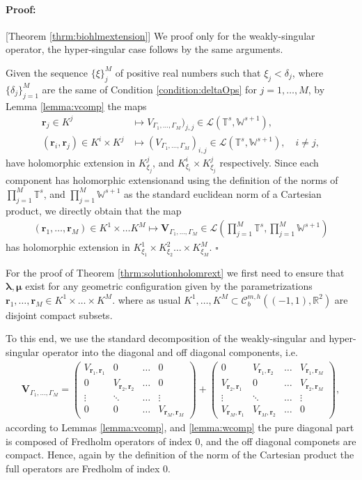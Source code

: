 \documentclass{article}
\newenvironment{proof}{\paragraph{Proof:}}{\hfill$\square$}
\newcommand{\bmu} {\bm{\mu}}
\newcommand{\IR}{{\mathbb R}}
\newcommand{\IT}{{\mathbb T}}
\newcommand{\IW}{{\mathbb W}}
\newcommand{\rgeoh}[2]{\mathcal{C}_b^{#1,#2}\left( (-1,1), \IR^2 \right)}
\newcommand{\bla}{\boldsymbol \lambda}
\newcommand{\br}{\bm{r}}
\begin{document}
\begin{proof}[Theorem \ref{thrm:biohlmextension}]
We proof only for the weakly-singular operator, the hyper-singular case follows by the same arguments. 

Given the sequence $\{\xi\}_j^M$ of positive real numbers such that $\xi_j < \delta_j$, where $\{\delta_j\}_{j=1}^M$ are the same of Condition \ref{condition:deltaOps} for $j=1,\hdots,M$, by Lemma \ref{lemma:vcomp} the maps  
\begin{align*}
\br_j \in K^j &\mapsto V_{\Gamma_1,\hdots,\Gamma_M})_{j,j} \in \mathcal{L}\left( \IT^s,\IW^{s+1}\right), \\
(\br_i,\br_j) \in K^i \times K^j &\mapsto (V_{\Gamma_1,\hdots,\Gamma_M})_{i,j} \in \mathcal{L}\left( \IT^s,\IW^{s+1}\right), \quad i \neq j,
\end{align*}
have holomorphic extension in $K^j_{\xi_j}$, and $K^i_{\xi_i} \times K^j_{\xi_j}$ respectively. Since each component has holomorphic extensionand using the definition of the norms of $  \prod_{j=1}^M \IT^s$, and  $\prod_{j=1}^M \IW^{s+1}$ as the standard euclidean norm of a Cartesian product, we directly obtain that the map 
\begin{align*}
(\br_1,\hdots,\br_M) \in K^1 \times \hdots K^M \mapsto \mathbf{V}_{\Gamma_1, \hdots,\Gamma_M} \in \mathcal{L} \left(  \prod_{j=1}^M \IT^s, \prod_{j=1}^M \IW^{s+1}
\right)
\end{align*}
has holomorphic extension in $K^1_{\xi_1} \times K^2_{\xi_2} \hdots \times K^M_{\xi_M}$.
\end{proof}

For the proof of Theorem \ref{thrm:solutionholomrext} we first need to ensure that $\bla, \bmu$ exist for any geometric configuration given by the parametrizations $\br_1,\hdots,\br_M \in K^1\times \hdots \times K^M$. where as usual $K^1,\hdots ,K^M \subset \rgeoh{m}{h}$ are disjoint compact subsets.

To this end, we use the standard decomposition of the weakly-singular and hyper-singular operator into the diagonal and off diagonal components, i.e.
\begin{align*}
\mathbf{V}_{\Gamma_1,\hdots,\Gamma_M} =
\begin{pmatrix}
V_{\br_1,\br_1} &0& \hdots &0\\
0& V_{\br_2,\br_2}& \hdots &0\\
\vdots & \ddots &\hdots & \vdots\\
0 & 0 &\hdots & V_{\br_M, \br_M}
\end{pmatrix}
+
\begin{pmatrix}
0 &V_{\br_1,\br_2}& \hdots &V_{\br_1,\br_M}\\
V_{\br_2,\br_1}& 0& \hdots &V_{\br_2,\br_M}\\
\vdots & \ddots &\hdots & \vdots\\
V_{\br_M,\br_1} & V_{\br_M,\br_2} &\hdots & 0
\end{pmatrix},
\end{align*}
according to Lemmas \ref{lemma:vcomp}, and \ref{lemma:wcomp} the pure diagonal part is composed of Fredholm operators of index $0$, and the off diagonal componets are compact. Hence, again by the definition of the norm of the Cartesian product the full operators are Fredholm of index $0$. 
\end{document}

